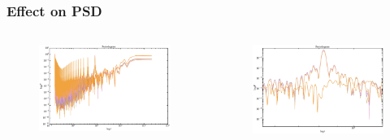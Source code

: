 \documentclass[hyperref={pdfpagelabels=false}]{beamer}
\begin{document}
\begin{frame}
\frametitle{Effect on PSD}
  \begin{columns}
  \centering
    \begin{column}{0.5\textwidth}
      \begin{figure}
        \includegraphics[scale=0.04]{images/Ps_full.jpg}
      \end{figure}
    \end{column}
    \begin{column}{0.5\textwidth}
        \begin{figure}
          \includegraphics[scale=0.12]{images/Ps_detail.jpg}
        \end{figure}
    \end{column}
  \end{columns}
  \begin{columns}
  \centering
    \begin{column}{0.5\textwidth}

\end{column}
\end{columns}
\end{frame}
\end{document}
